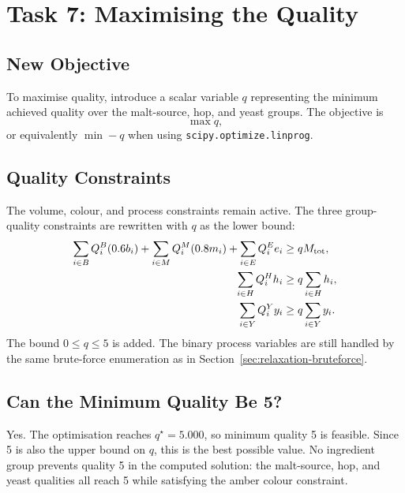 \section{Task 7: Maximising the Quality}
\label{sec:task7}

\subsection{New Objective}
\label{sec:task7-objective}
To maximise quality, introduce a scalar variable $q$ representing the minimum achieved quality over the malt-source, hop, and yeast groups. The objective is
\begin{equation}
  \max q,
  \label{eq:max-quality-objective}
\end{equation}
or equivalently $\min -q$ when using \texttt{scipy.optimize.linprog}.

\subsection{Quality Constraints}
\label{sec:task7-constraints}
The volume, colour, and process constraints remain active. The three group-quality constraints are rewritten with $q$ as the lower bound:
\begin{align}
  \sum_{i \in B} Q^B_i(0.6b_i)
  +\sum_{i \in M} Q^M_i(0.8m_i)
  +\sum_{i \in E} Q^E_i e_i
  &\geq qM_{\mathrm{tot}}, \label{eq:q-source}\\
  \sum_{i \in H} Q^H_i h_i
  &\geq q\sum_{i \in H}h_i, \label{eq:q-hop}\\
  \sum_{i \in Y} Q^Y_i y_i
  &\geq q\sum_{i \in Y}y_i. \label{eq:q-yeast}
\end{align}
The bound $0\leq q\leq5$ is added. The binary process variables are still handled by the same brute-force enumeration as in Section~\ref{sec:relaxation-bruteforce}.

\subsection{Can the Minimum Quality Be 5?}
\label{sec:task7-quality5}
Yes. The optimisation reaches $q^\star=5.000$, so minimum quality 5 is feasible. Since 5 is also the upper bound on $q$, this is the best possible value. No ingredient group prevents quality 5 in the computed solution: the malt-source, hop, and yeast qualities all reach 5 while satisfying the amber colour constraint.

